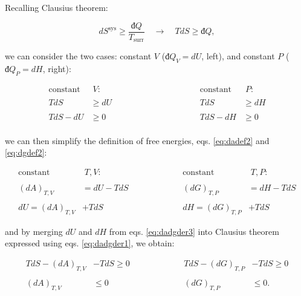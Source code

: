 \documentclass[
  9pt,
]{extbook}
\theoremstyle{definition}
\theoremstyle{definition}
\theoremstyle{definition}
\theoremstyle{definition}
\theoremstyle{remark}
\begin{document}
Recalling Clausius theorem:

\begin{equation}
d S^{\mathrm{sys}} \geq \frac{đQ}{T_{\text{surr}}} \quad \longrightarrow \quad TdS \geq đQ,
\label{eq:dssyscrit}
\end{equation}

we can consider the two cases: constant \(V\) (\(đQ_V=dU\), left), and constant \(P\) (\(đQ_P=dH\), right):

\begin{equation}
\begin{aligned}
\text{constant} & \; V:           & \qquad \qquad & \qquad \qquad &     \text{constant} & \; P: \\
\\
TdS & \geq dU           & &   &     TdS & \geq dH \\
\\
TdS -dU & \geq 0         & &   &      TdS -dH & \geq 0 \\
\end{aligned}
\label{eq:dadgder1}
\end{equation}

we can then simplify the definition of free energies, eqs. \eqref{eq:dadef2} and \eqref{eq:dgdef2}:

\begin{equation}
\begin{aligned}
\text{constant} & \; T,V:           & \qquad & \qquad &     \text{constant} & \; T,P: \\
\\
(dA)_{T,V} &= dU -TdS     & &   &       (dG)_{T,P} &= dH - TdS \\ 
\\
dU = (dA)_{T,V} &+TdS       & &   &       dH = (dG)_{T,P} &+TdS
\end{aligned}
\label{eq:dadgder3}
\end{equation}

and by merging \(dU\) and \(dH\) from eqs. \eqref{eq:dadgder3} into Clausius theorem expressed using eqs. \eqref{eq:dadgder1}, we obtain:

\begin{equation}
\begin{aligned}
TdS -(dA)_{T,V} &- TdS \geq 0 & \qquad & \qquad & TdS -(dG)_{T,P} &- TdS \geq 0 \\
\\
(dA)_{T,V} & \leq 0 & \qquad & \qquad & (dG)_{T,P} & \leq 0. \\
\end{aligned}
\label{eq:dadgcond}
\end{equation}
\end{document}
